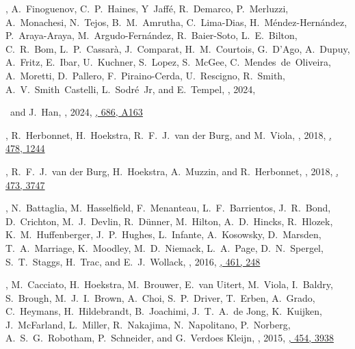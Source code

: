 
\item
\myself, A.~Finoguenov, C.~P.~Haines, Y~Jaffé, R.~Demarco, P.~Merluzzi, A.~Monachesi, N.~Tejos, B.~M.~Amrutha, C.~Lima-Dias, H.~M\'endez-Hern\'andez, P.~Araya-Araya, M.~Argudo-Fernández, R.~Baier-Soto, L.~E.~Bilton, C.~R.~Bom, L.~P.~Cassar\`a, J.~Comparat, H.~M.~Courtois, G.~D'Ago, A.~Dupuy, A.~Fritz, E.~Ibar, U.~Kuchner, S.~Lopez, S.~McGee, C.~Mendes~de~Oliveira, A.~Moretti, D.~Pallero, F.~Piraino-Cerda, U.~Rescigno, R.~Smith, A.~V.~Smith~Castelli, L.~Sodr\'e~Jr, and E.~Tempel,
, 2024,
\submitted{\aap}

\item
\myself\ and J.~Han,
,
2024, \href{https://ui.adsabs.harvard.edu/abs/2024A&A...686A.163S}{\aap, 686, A163}

\item
\myself, R.~Herbonnet, H.~Hoekstra, R.~F.~J.~van der Burg, and M.~Viola,
,
2018, \href{https://ui.adsabs.harvard.edu/abs/2018MNRAS.478.1244S}{\mnras, 478, 1244}

\item
\myself, R.~F.~J.~van der Burg, H.~Hoekstra, A.~Muzzin, and R.~Herbonnet,
,
2018, \href{https://ui.adsabs.harvard.edu/abs/2018MNRAS.473.3747S}{\mnras, 473, 3747}

\item
\myself, N.~Battaglia, M.~Hasselfield, F.~Menanteau, L.~F.~Barrientos, J.~R.~Bond, D.~Crichton, M.~J.~Devlin, R.~Dünner, M.~Hilton, A.~D.~Hincks, R.~Hlozek, K.~M.~Huffenberger, J.~P.~Hughes, L.~Infante, A.~Kosowsky, D.~Marsden, T.~A.~Marriage, K.~Moodley, M.~D.~Niemack, L.~A.~Page, D.~N.~Spergel, S.~T.~Staggs, H.~Trac, and E.~J.~Wollack,
,
2016, \href{https://ui.adsabs.harvard.edu/abs/2016MNRAS.461..248S}{\mnras, 461, 248}

\item
\myself, M.~Cacciato, H.~Hoekstra, M.~Brouwer, E.~van Uitert, M.~Viola, I.~Baldry, S.~Brough, M.~J.~I.~Brown, A.~Choi, S.~P.~Driver, T.~Erben, A.~Grado, C.~Heymans, H.~Hildebrandt, B.~Joachimi, J.~T.~A.~de Jong, K.~Kuijken, J.~McFarland, L.~Miller, R.~Nakajima, N.~Napolitano, P.~Norberg, A.~S.~G.~Robotham, P.~Schneider, and G.~Verdoes Kleijn,
,
2015, \href{https://ui.adsabs.harvard.edu/abs/2015MNRAS.454.3938S}{\mnras, 454, 3938}

